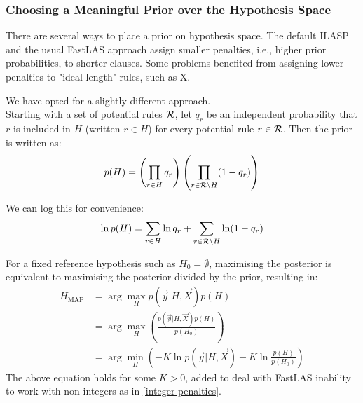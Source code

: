 


\subsubsection{Choosing a Meaningful Prior over the Hypothesis Space}

There are several ways to place a prior on hypothesis space. 
The default ILASP \cite{RefWorks:RefID:18-law2020ilasp} and the usual FastLAS approach assign smaller penalties, i.e., higher prior probabilities, to shorter clauses.
Some problems benefited from assigning lower penalties to "ideal length" rules, such as X.

We have opted for a slightly different approach. \\
Starting with a set of potential rules $\mathcal{R}$, let $q_r$ be an independent probability that $r$ is included in $H$ (written $r \in H$) for every potential rule $r \in \mathcal{R}$. Then the prior is written as:
\begin{align}
p(H) = \left(\prod_{r \in H} q_r\right)\left(\prod_{r \in \mathcal{R}\setminus H} (1-q_r)\right)
\end{align}

We can log this for convenience:
\begin{align}
\ln p(H) = \sum_{r \in H} \ln q_r + \sum_{r \in \mathcal{R}\setminus H} \ln(1-q_r) \label{log-prior-rule}
\end{align}


For a fixed reference hypothesis such as $H_0 = \emptyset$, maximising the posterior is equivalent to maximising the posterior divided by the prior, resulting in:
\begin{align}
H_{\text{MAP}}
& = \arg\max_{H} p(\vec{y}|H, \vec{X}) p(H)  \nonumber \\
& = \arg\max_{H} \left(\frac{ p(\vec{y}|H, \vec{X}) p(H)}{p(H_0)}\right)  \nonumber \\
& = \arg\min_{H} \left( -K\ln p(\vec{y}|H, \vec{X}) - K \ln \frac{p(H)}{p(H_0)}\right) \label{h-map-final}
\end{align}
The above equation holds for some $K > 0$, added to deal with FastLAS inability to work with non-integers as in \ref{integer-penalties}.

